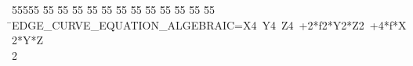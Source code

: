 %
%
\begin{tabbing}
55555 \= 55 \= 55 \= 55 \= 55 \= 55 \= 55 \= 55 \= 55 \= 55 \= 55 \= 55 \= 55 \= \>EDGE\_CURVE\_EQUATION\_ALGEBRAIC=X4\ Y4\ Z4\ +2*f2*Y2*Z2\ +4*f*X2*Y*Z\\[0pt]
2\>\end{tabbing}
